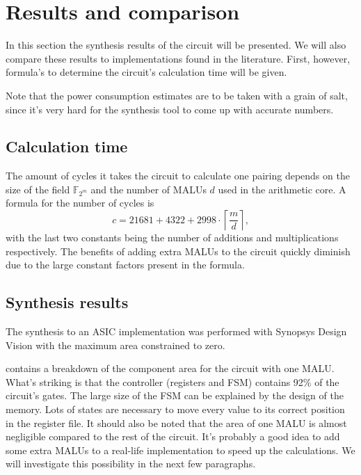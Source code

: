 \section{Results and comparison\label{section-results}}

In this section the synthesis results of the circuit will be presented. We will also compare these results to implementations found in the literature. First, however, formula's to determine the circuit's calculation time will be given.

Note that the power consumption estimates are to be taken with a grain of salt, since it's very hard for the synthesis tool to come up with accurate numbers.

\subsection{Calculation time}

The amount of cycles it takes the circuit to calculate one pairing depends on the size of the field $\mathbb{F}_{2^m}$ and the number of MALUs $d$ used in the arithmetic core. A formula for the number of cycles is
\begin{displaymath}c = 21681 + 4322 + 2998 \cdot \left\lceil \frac{m}{d} \right\rceil,\end{displaymath}
with the last two constants being the number of additions and multiplications respectively. The benefits of adding extra MALUs to the circuit quickly diminish due to the large constant factors present in the formula.

\subsection{Synthesis results}

The synthesis to an ASIC implementation was performed with Synopsys Design Vision with the maximum area constrained to zero. 

 contains a breakdown of the component area for the circuit with one MALU. What's striking is that the controller (registers and FSM) contains 92\% of the circuit's gates. The large size of the FSM can be explained by the design of the memory. Lots of states are necessary to move every value to its correct position in the register file. It should also be noted that the area of one MALU is almost negligible compared to the rest of the circuit. It's probably a good idea to add some extra MALUs to a real-life implementation to speed up the calculations. We will investigate this possibility in the next few paragraphs.

